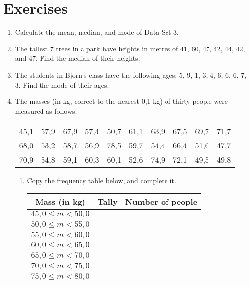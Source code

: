 \documentclass[10pt,a4paper,titlepage,twoside,openright]{report}
\begin{document}
\section{Exercises}
\begin{enumerate}

\item{Calculate the mean, median, and mode of Data Set 3.}

\item{The tallest 7 trees in a park have heights in metres of 41, 60, 47, 42, 44, 42, and 47. Find the median of their heights.}

\item{The students in Bjorn's class have the following ages: 5, 9, 1, 3, 4, 6, 6, 6, 7, 3. Find the mode of their ages.}

\item{The masses (in kg, correct to the nearest 0,1 kg) of thirty people were measured as follows:

\begin{tabular}{*{10}{c}}
45,1 & 57,9 & 67,9 & 57,4 & 50,7 & 61,1 & 63,9 & 67,5 & 69,7 & 71,7 \\
68,0 & 63,2 & 58,7 & 56,9 & 78,5 & 59,7 & 54,4 & 66,4 & 51,6 & 47,7 \\
70,9 & 54,8 & 59,1 & 60,3 & 60,1 & 52,6 & 74,9 & 72,1 & 49,5 & 49,8
\end{tabular}
    \begin{enumerate}
    \item Copy the frequency table below, and complete it.
    
        \begin{tabular}{|c|c|c|}
        \hline
        \textbf{Mass (in kg)} & \textbf{Tally} & \textbf{Number of people} \\
        \hline
        $45,0 \le m < 50,0$ & & \\
        \hline
        $50,0 \le m < 55,0$ & & \\
        \hline
        $55,0 \le m < 60,0$ & & \\
        \hline
        $60,0 \le m < 65,0$ & & \\
        \hline
        $65,0 \le m < 70,0$ & & \\
        \hline
        $70,0 \le m < 75,0$ & & \\
        \hline
        $75,0 \le m < 80,0$ & & \\
        \hline
        \end{tabular}
    

\end{enumerate}}
\end{enumerate}
\end{document}
